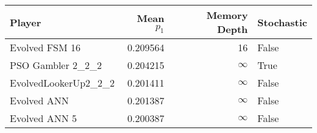 \begin{tabular}{lrrl}
\toprule
               Player &  Mean $p_1$ &  Memory Depth & Stochastic \\
\midrule
       Evolved FSM 16 &    0.209564 &            16 &      False \\
    PSO Gambler 2\_2\_2 &    0.204215 &            \(\infty\) &       True \\
 EvolvedLookerUp2\_2\_2 &    0.201411 &            \(\infty\) &      False \\
          Evolved ANN &    0.201387 &            \(\infty\) &      False \\
        Evolved ANN 5 &    0.200387 &            \(\infty\) &      False \\
\bottomrule
\end{tabular}
